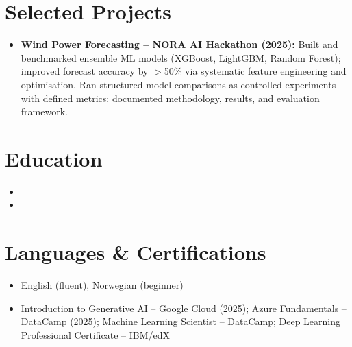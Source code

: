 \documentclass[11pt,a4paper,sans]{moderncv}
\begin{document}

\section{Selected Projects}
\vspace{1pt}
\begin{itemize}
\item \textbf{Wind Power Forecasting -- NORA AI Hackathon (2025):} Built and benchmarked ensemble ML models (XGBoost, LightGBM, Random Forest); improved forecast accuracy by $>$50\% via systematic feature engineering and optimisation. Ran structured model comparisons as controlled experiments with defined metrics; documented methodology, results, and evaluation framework.
\end{itemize}


\section{Education}
\vspace{1pt}
\begin{itemize}

\item{}

\vspace{3pt}

\item{}

\end{itemize}


\section{Languages \& Certifications}
\vspace{1pt}
\begin{itemize}
\item English (fluent), Norwegian (beginner)
\item Introduction to Generative AI -- Google Cloud (2025); Azure Fundamentals -- DataCamp (2025); Machine Learning Scientist -- DataCamp; Deep Learning Professional Certificate -- IBM/edX
\end{itemize}
\end{document}

